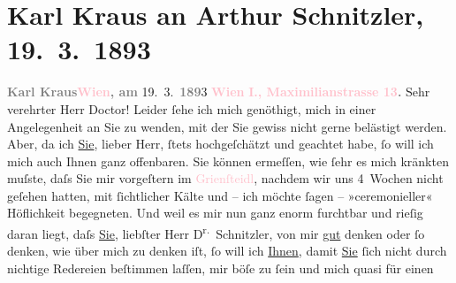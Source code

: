 

               \section[Karl Kraus an Arthur Schnitzler, 19. 3. 1893]{ Karl Kraus an Arthur Schnitzler, 19. 3. 1893}\nopagebreak{}\rehead{ }\normalsize\beginnumbering{} \toendnotes[C]{\smallbreak\pagebreak[2]} 
\toendnotes[C]{\smallbreak}\pstart
           \noindent{}{\pb}\textcolor{gray}{\textbf{Karl Kraus}}\hfill \textcolor{gray}{\textbf{\textcolor{pink}{Wien}{}\ledrightnote{\textcolor{pink}{Wien}}, am}}{ }19. 3. \textcolor{gray}{\textbf{189}}3\pend
           \pstart
           \textcolor{gray}{\textbf{\textcolor{pink}{Wien}{}\ledrightnote{\textcolor{pink}{Wien}}}}\pend
           \pstart
           \textcolor{gray}{\textbf{\textcolor{pink}{I., Maximilianstrasse 13}{}\ledrightnote{\textcolor{pink}{Mahlerstraße}}.}}\pend
           \pstart{}Sehr verehrter Herr Doctor!\pend\pstart
           Leider ſehe ich mich genöthigt, mich in einer Angelegenheit an Sie zu wenden, mit
                    der Sie gewiss nicht gerne belästigt werden. Aber, da ich \uline{Sie}, lieber Herr, ſtets hochgeſchätzt und geachtet habe, ſo will
                    ich \introOben{}mich\introOben{} auch Ihnen  ganz
                    offenbaren. Sie können ermeſſen, wie ſehr es mich kränkten muſste, daſs Sie mir
                    vorgeſtern im \textcolor{pink}{Grienſteidl}{}\ledrightnote{\textcolor{pink}{Café Griensteidl}}, nachdem wir uns
                    4 Wochen nicht geſehen hatten, mit ſichtlicher Kälte und – ich möchte ſagen –
                    »ceremonieller« Höflichkeit begegneten.\pend
           \pstart
           Und weil es mir nun ganz enorm furchtbar und rieſig daran liegt, daſs \uline{Sie}, liebſter Herr D\textsuperscript{r.} Schnitzler, von mir \uline{gut} denken oder
                    ſo denken, wie über mich zu denken iſt, ſo will ich \uline{Ihnen}, damit \uline{Sie}{ }ſich \introOben{}nicht\introOben{} durch
                    nichtige Redereien beſtimmen laſſen, mir böſe zu ſein und mich quasi für einen
